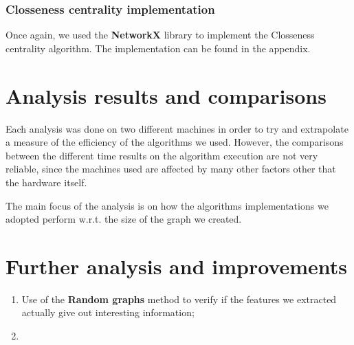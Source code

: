     \subsubsection*{Closseness centrality implementation}
    Once again, we used the \textbf{NetworkX} library to implement the Closseness centrality algorithm.
    The implementation can be found in the appendix.

    \section{Analysis results and comparisons}
    Each analysis was done on two different machines in order to try and extrapolate a measure of the efficiency of the algorithms we used. 
    However, the comparisons between the different time results on the algorithm execution are not very reliable, since the machines used
    are affected by many other factors other that the hardware itself. 

    The main focus of the analysis is on how the algorithms implementations we adopted perform w.r.t. the size of the graph we created.
    
    \section{Further analysis and improvements}
    \begin{enumerate}
        \item Use of the \textbf{Random graphs} method to verify if the features we extracted actually give out interesting information;
        \item 
    \end{enumerate} 
    